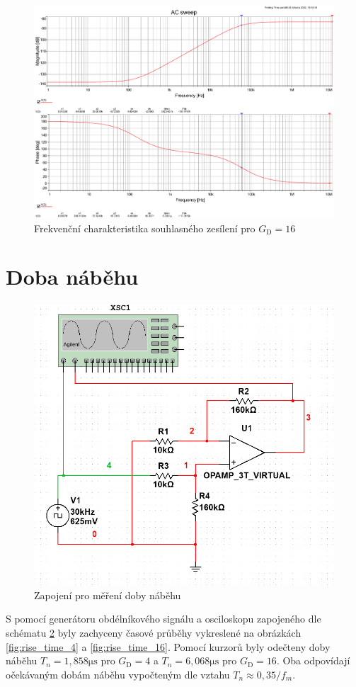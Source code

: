 \documentclass[twoside]{article}
\begin{document}
\begin{figure}[h!]
    \centering
    \includegraphics[width=0.92\linewidth]{bode_common_16.pdf}
    \caption{Frekvenční charakteristika souhlasného zesílení pro $G_\text{D} = 16$}
    \label{fig:bode_common_16}
\end{figure}
\newpage

\section{Doba náběhu}

\begin{figure}[h!]
    \centering
    \includegraphics[width=0.7\linewidth]{rise_time_schema.png}
    \caption{Zapojení pro měření doby náběhu}
    \label{fig:rise_time_schema}
\end{figure}

S pomocí generátoru obdélníkového signálu a osciloskopu zapojeného dle schématu \ref{fig:rise_time_schema}
byly zachyceny časové průběhy vykreslené na obrázkách \ref{fig:rise_time_4} a \ref{fig:rise_time_16}.
Pomocí kurzorů byly odečteny doby náběhu $T_n = 1,858 \si{\micro\second}$ pro $G_\text{D} = 4$ a 
$T_n = 6,068 \si{\micro\second}$ pro $G_\text{D} = 16$. Oba odpovídají očekávaným
dobám náběhu vypočteným dle vztahu $T_n \approx 0,35 / f_m$.
\end{document}
